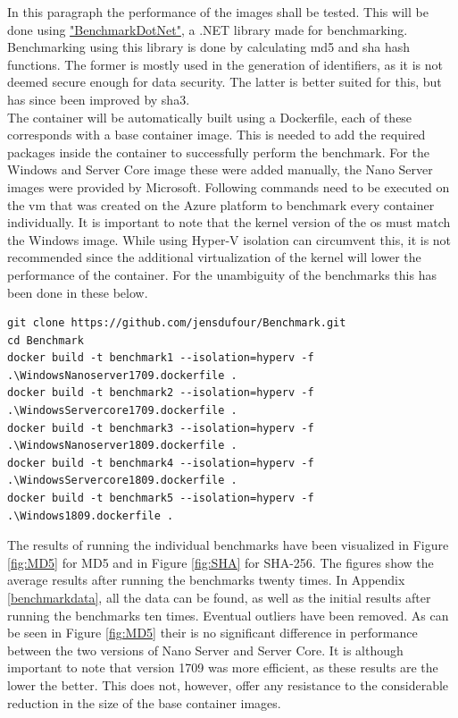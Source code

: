 In this paragraph the performance of the images shall be tested. This will be done using \href{https://benchmarkdotnet.org/}{"BenchmarkDotNet"}, a .NET library made for benchmarking. \autocite{Akinshin2019} Benchmarking using this library is done by calculating \acrfull{md5} and \acrfull{sha} hash functions. The former is mostly used in the generation of identifiers, as it is not deemed secure enough for data security. The latter is better suited for this, but has since been improved by \acrfull{sha3}. \autocite{Enkov2017}
\\
The container will be automatically built using a Dockerfile, each of these corresponds with a base container image. This is needed to add the required packages inside the container to successfully perform the benchmark. For the Windows and Server Core image these were added manually, the Nano Server images were provided by Microsoft. Following commands need to be executed on the \acrshort{vm} that was created on the Azure platform to benchmark every container individually. It is important to note that the kernel version of the \acrshort{os} must match the Windows image. While using Hyper-V isolation can circumvent this, it is not recommended since the additional virtualization of the kernel will lower the performance of the container. For the unambiguity of the benchmarks this has been done in these below.

\begin{lstlisting}[breaklines]
git clone https://github.com/jensdufour/Benchmark.git
cd Benchmark	
docker build -t benchmark1 --isolation=hyperv -f .\WindowsNanoserver1709.dockerfile .
docker build -t benchmark2 --isolation=hyperv -f .\WindowsServercore1709.dockerfile .
docker build -t benchmark3 --isolation=hyperv -f .\WindowsNanoserver1809.dockerfile .
docker build -t benchmark4 --isolation=hyperv -f .\WindowsServercore1809.dockerfile .
docker build -t benchmark5 --isolation=hyperv -f .\Windows1809.dockerfile .
\end{lstlisting}

The results of running the individual benchmarks have been visualized in Figure \ref{fig:MD5} for MD5 and in Figure \ref{fig:SHA} for SHA-256. The figures show the average results after running the benchmarks twenty times. In Appendix \ref{benchmarkdata}, all the data can be found, as well as the initial results after running the benchmarks ten times. Eventual outliers have been removed. 
As can be seen in Figure \ref{fig:MD5} their is no significant difference in performance between the two versions of Nano Server and Server Core. It is although important to note that version 1709 was more efficient, as these results are the lower the better. This does not, however, offer any resistance to the considerable reduction in the size of the base container images. 

